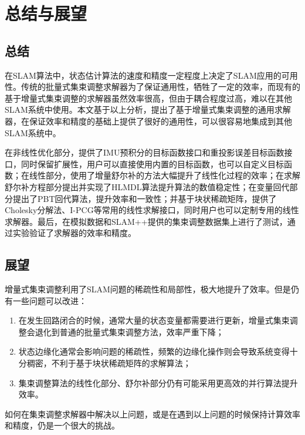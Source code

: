 \chapter{总结与展望}\label{ch:con}

\section{总结}

在SLAM算法中，状态估计算法的速度和精度一定程度上决定了SLAM应用的可用性。传统的批量式集束调整求解器为了保证通用性，牺牲了一定的效率，而现有的基于增量式集束调整的求解器虽然效率很高，但由于耦合程度过高，难以在其他SLAM系统中使用。本文基于以上分析，提出了基于增量式集束调整的通用求解器，在保证效率和精度的基础上提供了很好的通用性，可以很容易地集成到其他SLAM系统中。

在非线性优化部分，提供了IMU预积分的目标函数接口和重投影误差目标函数接口，同时保留扩展性，用户可以直接使用内置的目标函数，也可以自定义目标函数；在线性部分，使用了增量舒尔补的方法大幅提升了线性化过程的效率；在求解舒尔补方程部分提出并实现了HLMDL算法提升算法的数值稳定性；在变量回代部分提出了PBT回代算法，提升效率和一致性；并基于块状稀疏矩阵，提供了Cholesky分解法、I-PCG等常用的线性求解接口，同时用户也可以定制专用的线性求解器。最后，在模拟数据和SLAM++提供的集束调整数据集上进行了测试，通过实验验证了求解器的效率和精度。

\section{展望}

增量式集束调整利用了SLAM问题的稀疏性和局部性，极大地提升了效率。但是仍有一些问题可以改进：
\begin{enumerate}
    \item 在发生回路闭合的时候，通常大量的状态变量都需要进行更新，增量式集束调整会退化到普通的批量式集束调整方法，效率严重下降；
    \item 状态边缘化通常会影响问题的稀疏性，频繁的边缘化操作则会导致系统变得十分稠密，不利于基于块状稀疏矩阵的求解算法；
    \item 集束调整算法的线性化部分、舒尔补部分仍有可能采用更高效的并行算法提升效率。
\end{enumerate}
如何在集束调整求解器中解决以上问题，或是在遇到以上问题的时候保持计算效率和精度，仍是一个很大的挑战。
